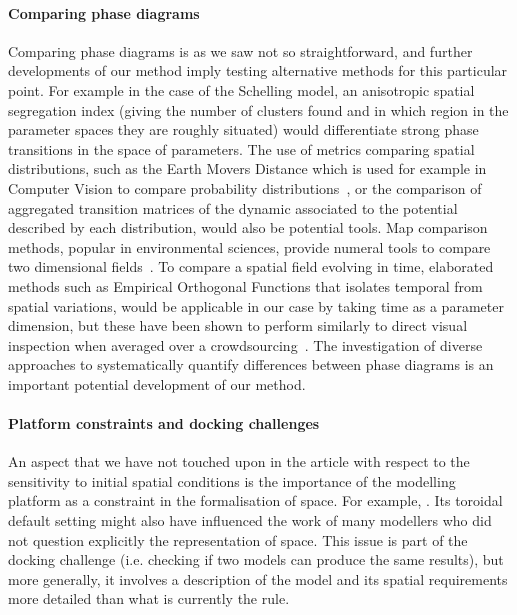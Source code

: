\documentclass[preprint,5p,times,twocolumn,authoryear]{elsarticle}
\begin{document}
\paragraph{Comparing phase diagrams} Comparing phase diagrams is as we saw not so straightforward, and further developments of our method imply testing alternative methods for this particular point. For example in the case of the Schelling model, an anisotropic spatial segregation index (giving the number of clusters found and in which region in the parameter spaces they are roughly situated) would differentiate strong  phase transitions in the space of  parameters. The use of metrics comparing spatial distributions, such as the Earth Movers Distance which is used for example in Computer Vision to compare probability distributions~\citep{rubner2000earth}, or the comparison of aggregated transition matrices of the dynamic associated to the potential described by each distribution, would also be potential tools. Map comparison methods, popular in environmental sciences, provide numeral tools to compare two dimensional fields~\citep{visser2006map}. To compare a spatial field evolving in time, elaborated methods such as Empirical Orthogonal Functions that isolates temporal from spatial variations, would be applicable in our case by taking time as a parameter dimension, but these have been shown to perform similarly to direct visual inspection when averaged over a crowdsourcing~\citep{10.1371/journal.pone.0178165}. The investigation of diverse approaches to systematically quantify differences between phase diagrams is an important potential development of our method.



\paragraph{Platform constraints and docking challenges}

An aspect that we have not touched upon in the article with respect to the sensitivity to initial spatial conditions is the importance of the modelling platform as a constraint in the formalisation of space. For example, . Its toroidal default setting might also have influenced the work of many modellers who did not question explicitly the representation of space. This issue is part of the docking challenge \citep{Axtelletal1996} (i.e. checking if two models can produce the same results), but more generally, it involves a description of the model and its spatial requirements more detailed than what is currently the rule.
\end{document}
